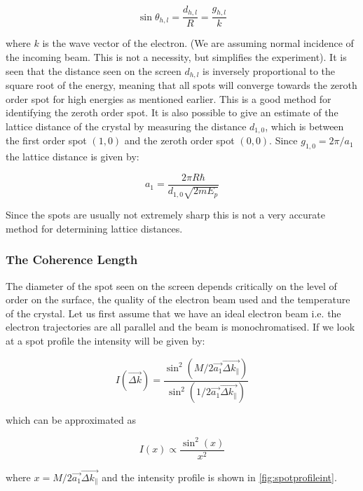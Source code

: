\begin{equation}
\sin{\theta_{h,l}} = \frac{d_{h,l}}{R} = \frac{g_{h,l}}{k}
\end{equation}

\noindent where $k$ is the wave vector of the electron. (We are assuming normal incidence of the incoming beam. This is not a necessity, but simplifies the experiment). It is seen that the distance seen on the screen $d_{h,l}$ is inversely proportional to the  square root of the energy, meaning that all spots will converge towards the zeroth order spot for high energies as mentioned earlier. This is a good method for identifying  the zeroth order spot. It is also possible to give an estimate of the lattice distance of the crystal by measuring the distance $d_{1,0}$, which is between the first order spot $(1,0)$ and the zeroth order spot $(0,0)$. Since $g_{1,0}=2\pi/a_1$ the lattice distance is given by:

\begin{equation}
a_1=\frac{2\pi R\hbar}{d_{1,0}\sqrt{2mE_p}}
\end{equation}

Since the spots are usually not extremely sharp this is not a very accurate method for determining lattice distances.

\subsubsection{The Coherence Length}
The diameter of the spot seen on the screen depends critically on the level of order on the surface, the quality of the electron beam used and the temperature of the crystal. Let us first assume that we have an ideal electron beam i.e. the electron trajectories are all parallel and the beam is monochromatised. If we look at a spot profile the intensity will be given by:

\begin{equation}
I\left(\vec{\Delta k}\right)=\frac{\sin^2\left(M/2 \vec{a_1}\vec{\Delta k_{\parallel}}\right)}{\sin^2\left(1/2\vec{a_1}\vec{\Delta k_{\parallel}}\right)}
\end{equation}

\noindent which can be approximated as

\begin{equation}
I(x)\propto\frac{\sin^2(x)}{x^2}
\end{equation}

\noindent where $x=M/2\vec{a_1}\vec{\Delta k_{\parallel}}$ and the intensity profile is shown in \autoref{fig:spotprofileint}.

